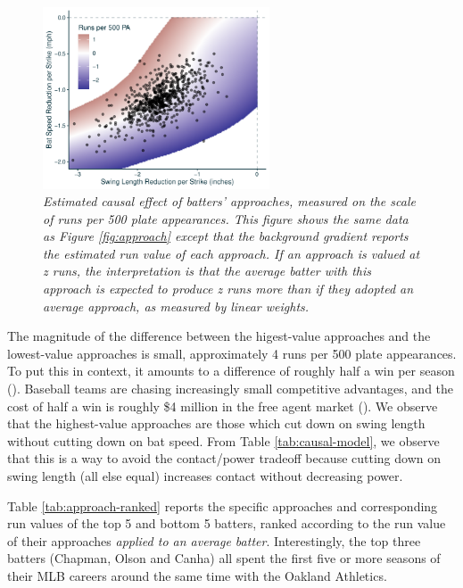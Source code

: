 \documentclass{article}
\begin{document}
      \begin{figure}[H]
        \centering
        \includegraphics[width = 0.6\textwidth]{../../figures/approach_run_value.pdf}
        \caption{\it Estimated causal effect of batters' approaches, measured on the scale of runs per 500 plate appearances. This figure shows the same data as Figure \ref{fig:approach} except that the background gradient reports the estimated run value of each approach. If an approach is valued at z runs, the interpretation is that the average batter with this approach is expected to produce z runs more than if they adopted an average approach, as measured by linear weights.}
        \label{fig:approach-run-value}
      \end{figure}

      The magnitude of the difference between the higest-value approaches and the lowest-value approaches is small, approximately 4 runs per 500 plate appearances. To put this in context, it amounts to a difference of roughly half a win per season (\cite{slowinski_converting_2010}). Baseball teams are chasing increasingly small competitive advantages, and the cost of half a win is roughly \$4 million in the free agent market (\cite{clemens_what_2021}). We observe that the highest-value approaches are those which cut down on swing length without cutting down on bat speed. From Table \ref{tab:causal-model}, we observe that this is a way to avoid the contact/power tradeoff because cutting down on swing length (all else equal) increases contact without decreasing power.

      Table \ref{tab:approach-ranked} reports the specific approaches and corresponding run values of the top 5 and bottom 5 batters, ranked according to the run value of their approaches {\it applied to an average batter}. Interestingly, the top three batters (Chapman, Olson and Canha) all spent the first five or more seasons of their MLB careers around the same time with the Oakland Athletics.
\end{document}
